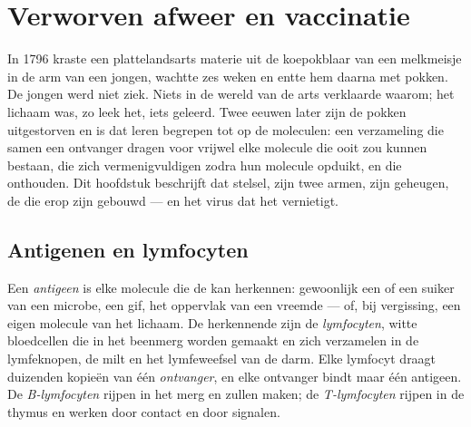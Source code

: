 \chapter{Verworven afweer en vaccinatie}\label{ch:g12:adaptive-immunity}

In 1796 kraste een plattelandsarts materie uit de koepokblaar van een
melkmeisje in de arm van een jongen, wachtte zes weken en entte hem
daarna met pokken. De jongen werd niet ziek. Niets in de wereld van de
arts verklaarde waarom; het lichaam was, zo leek het, iets geleerd. Twee
eeuwen later zijn de pokken uitgestorven en is dat leren begrepen tot op
de moleculen: een verzameling  die samen een ontvanger dragen voor
vrijwel elke molecule die ooit zou kunnen bestaan, die zich
vermenigvuldigen zodra hun molecule opduikt, en die onthouden. Dit
hoofdstuk beschrijft dat stelsel, zijn twee armen, zijn geheugen, de
 die erop zijn gebouwd --- en het virus dat het vernietigt.

\section{Antigenen en lymfocyten}

\begin{definition}\label{def:g12:adaptive-immunity:antigen}
Een \emph{antigeen} is elke molecule die de  kan herkennen: gewoonlijk een  of een suiker van een microbe,
een gif, het oppervlak van een vreemde  --- of, bij vergissing, een
eigen molecule van het lichaam. De herkennende  zijn de
\emph{lymfocyten}, witte bloedcellen die in het beenmerg
worden gemaakt en zich verzamelen in de lymfeknopen, de milt en het
lymfeweefsel van de darm. Elke lymfocyt draagt duizenden kopieën van één
\emph{ontvanger}, en elke ontvanger bindt maar één antigeen. De
\emph{B-lymfocyten} rijpen in het merg en zullen  maken; de
\emph{T-lymfocyten} rijpen in de thymus en werken door contact en door
signalen.
\end{definition}

